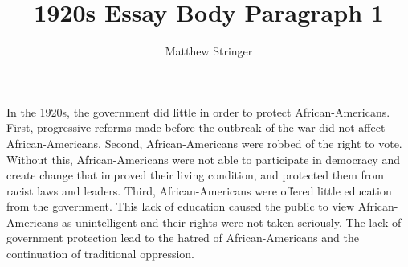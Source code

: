 \documentclass[12pt]{article}
\title{1920s Essay Body Paragraph 1}
\author{Matthew Stringer}
\date{}
\begin{document}
    \maketitle
    In the 1920s, the government did little in order to protect African-Americans.
% 
    First, progressive reforms made before the outbreak of the war did not affect 
    African-Americans. 
% 
    Second, African-Americans were robbed of the right to vote.
    Without this, African-Americans were not able to participate in democracy and 
    create change that improved their living condition, and protected them from racist
    laws and leaders.
% 
    Third, African-Americans were offered little education from the government.
    This lack of education caused the public to view African-Americans as unintelligent 
    and their rights were not taken seriously.
% 
    The lack of government protection lead to the hatred of African-Americans and 
    the continuation of traditional oppression.
\end{document}
